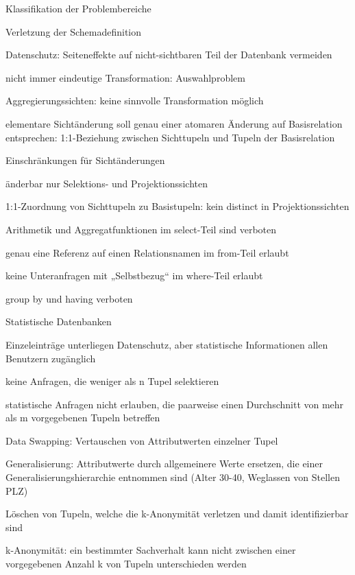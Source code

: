 \documentclass[a4paper]{article}
\begin{document}
\begin{multicols}{3}
    Klassifikation der Problembereiche
    \begin{itemize*}
        \item Verletzung der Schemadefinition
        \item Datenschutz: Seiteneffekte auf nicht-sichtbaren Teil der Datenbank vermeiden
        \item nicht immer eindeutige Transformation: Auswahlproblem
        \item Aggregierungssichten: keine sinnvolle Transformation möglich
        \item elementare Sichtänderung soll genau einer atomaren Änderung auf Basisrelation entsprechen: 1:1-Beziehung zwischen Sichttupeln und Tupeln der Basisrelation
    \end{itemize*}

    Einschränkungen für Sichtänderungen
    \begin{itemize*}
        \item änderbar nur Selektions- und Projektionssichten
        \item 1:1-Zuordnung von Sichttupeln zu Basistupeln: kein distinct in Projektionssichten
        \item Arithmetik und Aggregatfunktionen im select-Teil sind verboten
        \item genau eine Referenz auf einen Relationsnamen im from-Teil erlaubt
        \item keine Unteranfragen mit „Selbstbezug“ im where-Teil erlaubt
        \item group by und having verboten
    \end{itemize*}

    Statistische Datenbanken
    \begin{itemize*}
        \item Einzeleinträge unterliegen Datenschutz, aber statistische Informationen allen Benutzern zugänglich
        \begin{itemize*}
            \item keine Anfragen, die weniger als n Tupel selektieren
            \item statistische Anfragen nicht erlauben, die paarweise einen Durchschnitt von mehr als m vorgegebenen Tupeln betreffen
            \item Data Swapping: Vertauschen von Attributwerten einzelner Tupel
            \item Generalisierung: Attributwerte durch allgemeinere Werte ersetzen, die einer Generalisierungshierarchie entnommen sind (Alter 30-40, Weglassen von Stellen PLZ)
            \item Löschen von Tupeln, welche die k-Anonymität verletzen und damit identifizierbar sind
        \end{itemize*}
        \item k-Anonymität: ein bestimmter Sachverhalt kann nicht zwischen einer vorgegebenen Anzahl k von Tupeln unterschieden werden
    \end{itemize*}


\end{multicols}
\end{document}
